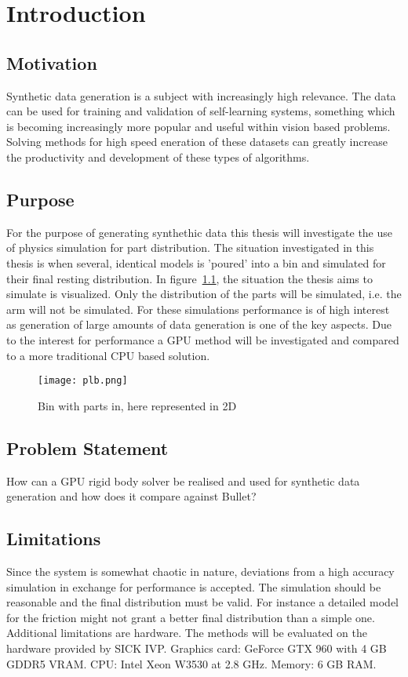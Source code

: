\chapter{Introduction}\label{cha:intro}

\section{Motivation}

Synthetic data generation is a subject with increasingly high relevance.
The data can be used for training and validation of self-learning systems,
something which is becoming increasingly more popular and useful within vision
based problems. Solving methods for high speed eneration of these datasets
can greatly increase the productivity and development of these
types of algorithms.

\section{Purpose}

For the purpose of generating synthethic data this thesis will investigate the use of physics
simulation for part distribution. The situation investigated in this thesis
is when several, identical models is  'poured' into a bin and simulated for their
final resting distribution. In figure~\ref{fig:plb}, the situation
the thesis aims to simulate is visualized. Only the distribution of the parts
will be simulated, i.e. the arm will not be simulated. For these simulations
performance is of high interest as generation of large amounts of data generation
is one of the key aspects. Due to the interest for performance a GPU method will
be investigated and compared to a more traditional CPU based solution.

\begin{figure}[ht]
  \centering
  \texttt{[image: plb.png]}
  \caption{Bin with parts in, here represented in 2D}
  \label{fig:plb}
\end{figure}

\section{Problem Statement}
How can a GPU rigid body solver be realised and used for synthetic data generation
 and how does it compare against Bullet?

\section{Limitations}
Since the system is somewhat chaotic in nature, deviations from a high accuracy
simulation in exchange for performance is accepted. The simulation should be reasonable
and the final distribution must be valid. For instance a detailed
model for the friction might not grant a better final distribution than a simple one.
Additional limitations are hardware. The methods will be evaluated on the hardware
provided by SICK IVP. Graphics card: GeForce GTX 960 with 4 GB GDDR5 VRAM.
CPU: Intel Xeon W3530 at 2.8 GHz.
Memory: 6 GB RAM.

